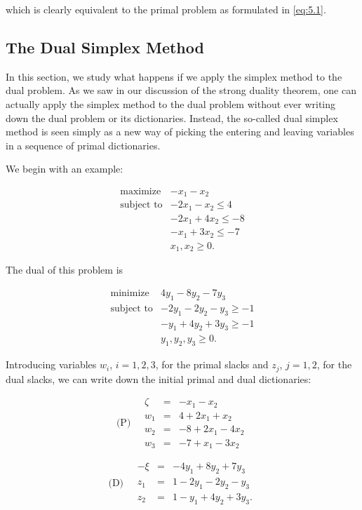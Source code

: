 \documentclass{article}
\begin{document}
which is clearly equivalent to the primal problem as formulated in \eqref{eq:5.1}.

\subsection{The Dual Simplex Method}

In this section, we study what happens if we apply the simplex method to the dual problem. As we saw in our discussion of the strong duality theorem, one can actually apply the simplex method to the dual problem without ever writing down the dual problem or its dictionaries. Instead, the so-called dual simplex method is seen simply as a new way of picking the entering and leaving variables in a sequence of primal dictionaries.

We begin with an example:

\[
\begin{array}{ll}
\text{maximize} & -x_{1} - x_{2} \\
\text{subject to} & -2x_{1} - x_{2} \leq 4 \\
& -2x_{1} + 4x_{2} \leq -8 \\
& -x_{1} + 3x_{2} \leq -7 \\
& x_{1}, x_{2} \geq 0.
\end{array}
\]

The dual of this problem is

\[
\begin{array}{ll}
\text{minimize} & 4y_{1} - 8y_{2} - 7y_{3} \\
\text{subject to} & -2y_{1} - 2y_{2} - y_{3} \geq -1 \\
& -y_{1} + 4y_{2} + 3y_{3} \geq -1 \\
& y_{1}, y_{2}, y_{3} \geq 0.
\end{array}
\]

Introducing variables $w_{i}$, $i=1,2,3$, for the primal slacks and $z_{j}$, $j=1,2$, for the dual slacks, we can write down the initial primal and dual dictionaries:

\[
\text{(P)} \quad 
\begin{array}{rcl}
\zeta &=& -x_{1} - x_{2} \\
w_{1} &=& 4 + 2x_{1} + x_{2} \\
w_{2} &=& -8 + 2x_{1} - 4x_{2} \\
w_{3} &=& -7 + x_{1} - 3x_{2}
\end{array}
\]

\[
\text{(D)} \quad 
\begin{array}{rcl}
-\xi &=& -4y_{1} + 8y_{2} + 7y_{3} \\
z_{1} &=& 1 - 2y_{1} - 2y_{2} - y_{3} \\
z_{2} &=& 1 - y_{1} + 4y_{2} + 3y_{3}.
\end{array}
\]
\end{document}
